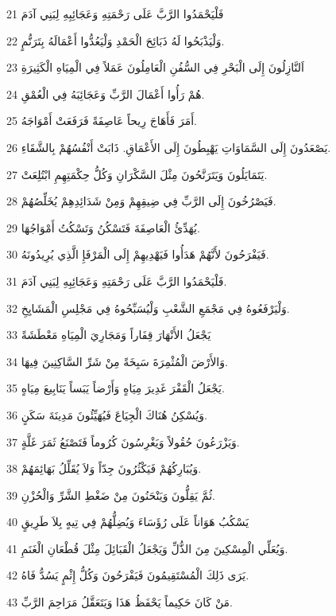 \par 21 فَلْيَحْمَدُوا الرَّبَّ عَلَى رَحْمَتِهِ وَعَجَائِبِهِ لِبَنِي آدَمَ
\par 22 وَلْيَذْبَحُوا لَهُ ذَبَائِحَ الْحَمْدِ وَلْيَعُدُّوا أَعْمَالَهُ بِتَرَنُّمٍ.
\par 23 اَلنَّازِلُونَ إِلَى الْبَحْرِ فِي السُّفُنِ الْعَامِلُونَ عَمَلاً فِي الْمِيَاهِ الْكَثِيرَةِ
\par 24 هُمْ رَأُوا أَعْمَالَ الرَّبِّ وَعَجَائِبَهُ فِي الْعُمْقِ.
\par 25 أَمَرَ فَأَهَاجَ رِيحاً عَاصِفَةً فَرَفَعَتْ أَمْوَاجَهُ.
\par 26 يَصْعَدُونَ إِلَى السَّمَاوَاتِ يَهْبِطُونَ إِلَى الأَعْمَاقِ. ذَابَتْ أَنْفُسُهُمْ بِالشَّقَاءِ.
\par 27 يَتَمَايَلُونَ وَيَتَرَنَّحُونَ مِثْلَ السَّكْرَانِ وَكُلُّ حِكْمَتِهِمِ ابْتُلِعَتْ.
\par 28 فَيَصْرُخُونَ إِلَى الرَّبِّ فِي ضِيقِهِمْ وَمِنْ شَدَائِدِهِمْ يُخَلِّصُهُمْ.
\par 29 يُهَدِّئُ الْعَاصِفَةَ فَتَسْكُنُ وَتَسْكُتُ أَمْوَاجُهَا.
\par 30 فَيَفْرَحُونَ لأَنَّهُمْ هَدَأُوا فَيَهْدِيهِمْ إِلَى الْمَرْفَإِ الَّذِي يُرِيدُونَهُ.
\par 31 فَلْيَحْمَدُوا الرَّبَّ عَلَى رَحْمَتِهِ وَعَجَائِبِهِ لِبَنِي آدَمَ.
\par 32 وَلْيَرْفَعُوهُ فِي مَجْمَعِ الشَّعْبِ وَلْيُسَبِّحُوهُ فِي مَجْلِسِ الْمَشَايِخِ.
\par 33 يَجْعَلُ الأَنْهَارَ قِفَاراً وَمَجَارِيَ الْمِيَاهِ مَعْطَشَةً
\par 34 وَالأَرْضَ الْمُثْمِرَةَ سَبِخَةً مِنْ شَرِّ السَّاكِنِينَ فِيهَا.
\par 35 يَجْعَلُ الْقَفْرَ غَدِيرَ مِيَاهٍ وَأَرْضاً يَبَساً يَنَابِيعَ مِيَاهٍ.
\par 36 وَيُسْكِنُ هُنَاكَ الْجِيَاعَ فَيُهَيِّئُونَ مَدِينَةَ سَكَنٍ.
\par 37 وَيَزْرَعُونَ حُقُولاً وَيَغْرِسُونَ كُرُوماً فَتَصْنَعُ ثَمَرَ غَلَّةٍ.
\par 38 وَيُبَارِكُهُمْ فَيَكْثُرُونَ جِدّاً وَلاَ يُقَلِّلُ بَهَائِمَهُمْ.
\par 39 ثُمَّ يَقِلُّونَ وَيَنْحَنُونَ مِنْ ضَغْطِ الشَّرِّ وَالْحُزْنِ.
\par 40 يَسْكُبُ هَوَاناً عَلَى رُؤَسَاءَ وَيُضِلُّهُمْ فِي تِيهٍ بِلاَ طَرِيقٍ
\par 41 وَيُعَلِّي الْمِسْكِينَ مِنَ الذُّلِّ وَيَجْعَلُ الْقَبَائِلَ مِثْلَ قُطْعَانِ الْغَنَمِ.
\par 42 يَرَى ذَلِكَ الْمُسْتَقِيمُونَ فَيَفْرَحُونَ وَكُلُّ إِثْمٍ يَسُدُّ فَاهُ.
\par 43 مَنْ كَانَ حَكِيماً يَحْفَظُ هَذَا وَيَتَعَقَّلُ مَرَاحِمَ الرَّبِّ.

